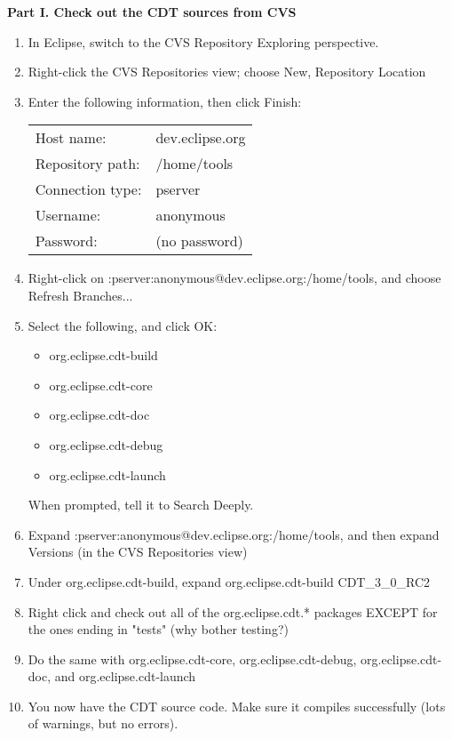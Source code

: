 
\hspace{1em}\textbf{Part I.  Check out the CDT sources from CVS}

\begin{enumerate}
\item  In Eclipse, switch to the CVS Repository Exploring perspective.
\item  Right-click the CVS Repositories view; choose New, Repository Location
\item  Enter the following information, then click Finish: \\
\begin{tabular}{ll}
         Host name:       & dev.eclipse.org \\
         Repository path: & /home/tools \\
         Connection type: & pserver \\
         Username:        & anonymous \\
         Password:        & (no password) \\
\end{tabular}
\item  Right-click on :pserver:anonymous@dev.eclipse.org:/home/tools, and choose
    Refresh Branches...
\item  Select the following, and click OK:
\begin{itemize}
    \item     org.eclipse.cdt-build
    \item     org.eclipse.cdt-core
    \item     org.eclipse.cdt-doc
    \item     org.eclipse.cdt-debug
    \item     org.eclipse.cdt-launch
\end{itemize}
    When prompted, tell it to Search Deeply.
\item  Expand :pserver:anonymous@dev.eclipse.org:/home/tools,
    and then expand Versions (in the CVS Repositories view)
\item  Under org.eclipse.cdt-build, expand org.eclipse.cdt-build CDT\_3\_0\_RC2
\item  Right click and check out all of the org.eclipse.cdt.* packages
    EXCEPT for the ones ending in "tests" (why bother testing?)
\item  Do the same with org.eclipse.cdt-core, org.eclipse.cdt-debug,
    org.eclipse.cdt-doc, and org.eclipse.cdt-launch
\item You now have the CDT source code.  Make sure it compiles successfully
    (lots of warnings, but no errors).


\end{enumerate}
